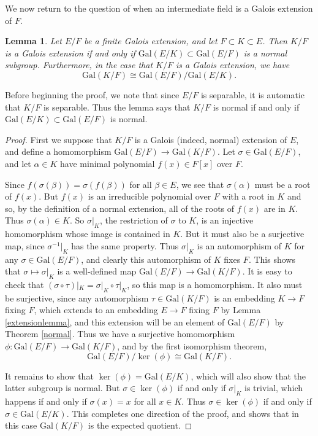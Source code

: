 \documentclass[12pt]{report}
\newtheorem{lemma}[thm]{Lemma}
\theoremstyle{definition}
\def\aa{\alpha}
\def\bb{\beta}
\def\Gal{\text{Gal}}
\begin{document}
We now return to the question of when an intermediate field is a Galois
extension of $F$.

\begin{lemma}
    Let $E/F$ be a finite Galois extension, and let $F \subset  K \subset  E$. Then $K/F$ is a Galois extension if and only if $\Gal(E/K) \subset  \Gal(E/F)$ is a normal subgroup. Furthermore, in the case that $K/F$ is a Galois extension, we have $$\Gal(K/F)\cong \Gal(E/F)/\Gal(E/K).$$
\end{lemma}

Before beginning the proof, we note that since $E/F$ is separable, it is automatic that $K/F$ is separable. Thus the lemma says that $K/F$ is normal if and only if $\Gal(E/K) \subset  \Gal(E/F)$ is normal.

\begin{proof}
    First we suppose that $K/F$ is a Galois (indeed, normal) extension of $E$, and define a homomorphism $\Gal(E/F) \to  \Gal(K/F)$. Let $\sigma\in \Gal(E/F)$, and let $\aa\in K$ have minimal polynomial $f(x)\in F[x]$ over $F$.

    Since $f(\sigma(\bb)) = \sigma(f(\bb))$ for all $\bb\in E$, we see that $\sigma(\aa)$ must be a root of $f(x)$. But $f(x)$ is an irreducible polynomial over $F$ with a root in $K$ and so, by the definition of a normal extension, all of the roots of $f(x)$ are in $K$. Thus $\sigma(\aa)\in K$. So $\sigma|_K$, the restriction of $\sigma$ to $K$, is an injective homomorphism whose image is contained in $K$. But it must also be a surjective map, since $\sigma^{-1}|_K$ has the same property. Thus $\sigma|_K$ is an automorphism of $K$ for any $\sigma\in \Gal(E/F)$, and clearly this automorphism of $K$ fixes $F$. This shows that $\sigma \mapsto \sigma|_K$ is a well-defined map $\Gal(E/F) \to  \Gal(K/F)$. It is easy to check that $(\sigma \circ \tau )|_K = \sigma|_K \circ \tau|_K$, so this map is a homomorphism. It also must be surjective, since any automorphism $\tau\in \Gal(K/F)$ is an embedding $K \to  F$ fixing $F$, which extends to an embedding $E \to  F$ fixing $F$ by Lemma \ref{extensionlemma}, and this extension will be an element of $\Gal(E/F)$ by Theorem \ref{normal}. Thus we have a surjective homomorphism $\phi: \Gal(E/F) \to  \Gal(K/F)$, and by the first isomorphism theorem,
    $$ \Gal(E/F)/\ker(\phi)\cong \Gal(K/F).$$

    It remains to show that $\ker(\phi) = \Gal(E/K)$, which will also show that the latter subgroup is normal. But $\sigma\in \ker(\phi)$ if and only if $\sigma|_K$ is trivial, which happens if and only if $\sigma(x) = x$ for all $x\in K$. Thus $\sigma\in \ker(\phi)$ if and only if $\sigma\in \Gal(E/K)$. This completes one direction of the proof, and shows that in this case $\Gal(K/F)$ is the expected quotient.


\end{proof}
\end{document}

